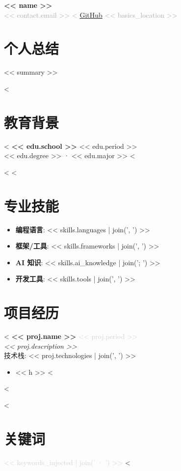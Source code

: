 \documentclass[11pt,a4paper]{article}
\begin{document}
\begin{center}
  {\Huge\bfseries << name >>}\\[6pt]
  \textcolor{darkgray}{
    << contact.email >> \quad
    <%
    \href{<< contact.github >>}{GitHub} \quad
    << basics_location >>
  }
\end{center}

\vspace{-4pt}

\section{个人总结}
<< summary >>

<%
\section{教育背景}
<%
\noindent\textbf{<< edu.school >>} \hfill << edu.period >> \\
<< edu.degree >> · << edu.major >> <%

<%
<%

\section{专业技能}
\begin{itemize}
  \item \textbf{编程语言}: << skills.languages | join(', ') >>
  \item \textbf{框架/工具}: << skills.frameworks | join(', ') >>
  \item \textbf{AI 知识}: << skills.ai_knowledge | join('; ') >>
  \item \textbf{开发工具}: << skills.tools | join(', ') >>
\end{itemize}

\section{项目经历}
<%
\noindent\textbf{<< proj.name >>} \hfill \textcolor{lightgray}{<< proj.period >>}\\
\textit{<< proj.description >>}\\
技术栈: << proj.technologies | join(', ') >>
\begin{itemize}
<%
  \item << h >>
<%
\end{itemize}

<%

<%
\section{关键词}
\textcolor{lightgray}{\small << keywords_injected | join(' · ') >>}
<%
\end{document}
